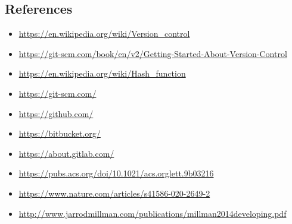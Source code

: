 \subsection{References}
\begin{itemize}
    \item[-] \url{https://en.wikipedia.org/wiki/Version_control}
    \item[-] \url{https://git-scm.com/book/en/v2/Getting-Started-About-Version-Control}
    \item[-] \url{https://en.wikipedia.org/wiki/Hash_function}
    \item[-] \url{https://git-scm.com/}
    \item[-] \url{https://github.com/}
    \item[-] \url{https://bitbucket.org/}
    \item[-] \url{https://about.gitlab.com/}
    \item[-] \url{https://pubs.acs.org/doi/10.1021/acs.orglett.9b03216}
    \item[-] \url{https://www.nature.com/articles/s41586-020-2649-2}
    \item[-] \url{http://www.jarrodmillman.com/publications/millman2014developing.pdf}
\end{itemize}
